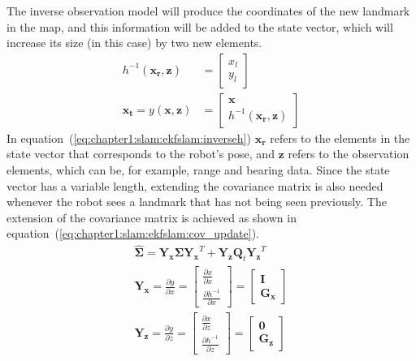 The inverse observation model will produce the coordinates of the new landmark in the map, and this information will be added to the state vector, which will increase its size (in this case) by two new elements.
\begin{align}
    h^{-1}\left(\mathbf{x_r}, \mathbf{z}\right) &= \begin{bmatrix}
        x_l \\ y_l
    \end{bmatrix}
    \label{eq:chapter1:slam:ekfslam:inverseh}\\
    \mathbf{x_t} = y\left(\mathbf{x}, \mathbf{z}\right) &= \begin{bmatrix}
        \mathbf{x} \\ h^{-1}\left(\mathbf{x_r}, \mathbf{z}\right)
    \end{bmatrix}
    \label{eq:chapter1:slam:ekfslam:extension_y}
\end{align}
In equation~(\ref{eq:chapter1:slam:ekfslam:inverseh}) $\mathbf{x_r}$ refers to the elements in the state vector that corresponds to the robot's pose, and $\mathbf{z}$ refers to the observation elements, which can be, for example, range and bearing data. Since the state vector has a variable length, extending the covariance matrix is also needed whenever the robot sees a landmark that has not being seen previously. The extension of the covariance matrix is achieved as shown in equation~(\ref{eq:chapter1:slam:ekfslam:cov_update}).
\begin{align}
    \mathbf{\hat\Sigma} = \mathbf{Y_x} \mathbf{\Sigma} \mathbf{Y_x}^T + \mathbf{Y_z} \mathbf{Q}_t \mathbf{Y_z}^T
    \label{eq:chapter1:slam:ekfslam:cov_update}\\
    \mathbf{Y_x} = \frac{\partial y}{\partial x} = \begin{bmatrix}
        \frac{\partial x}{\partial x} \\ \frac{\partial h^{-1}}{\partial x}
    \end{bmatrix} = \begin{bmatrix}
    \mathbf{I} \\ \mathbf{G_x}
    \end{bmatrix}
    \label{eq:chapter1:slam:ekfslam:yx}\\
    \mathbf{Y_z} = \frac{\partial y}{\partial z} = \begin{bmatrix}
        \frac{\partial x}{\partial z} \\ \frac{\partial h^{-1}}{\partial z}
    \end{bmatrix} = \begin{bmatrix}
        \mathbf{0} \\ \mathbf{G_z}
    \end{bmatrix}
    \label{eq:chapter1:slam:ekfslam:yz}
\end{align}
